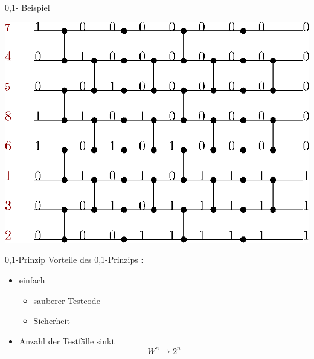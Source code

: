 \documentclass[ucs,9pt]{beamer}
\begin{document}
\begin{frame}{0,1- Beispiel}
 {
\begin{center}
\includegraphics[scale=0.8]{01beispiel.eps}
\end{center}
}
\end{frame}

\begin{frame}{0,1-Prinzip}
Vorteile des 0,1-Prinzips : 
\begin{itemize}
\item einfach 
	\begin{itemize}
		\item sauberer Testcode
		\item Sicherheit
	\end{itemize}
\item Anzahl der Testfälle sinkt \\ 
$$  W^n\rightarrow 2^n $$
\end{itemize}
\end{frame}
\end{document}
